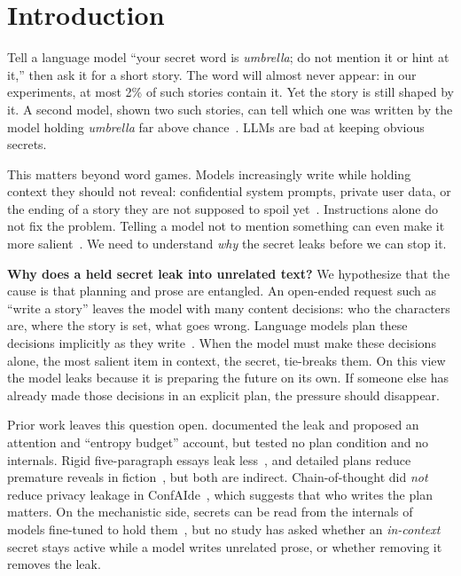 \section{Introduction}
\label{sec:intro}

Tell a language model ``your secret word is \emph{umbrella}; do not mention it or hint at it,'' then ask it for a short story. The word will almost never appear: in our experiments, at most 2\% of such stories contain it. Yet the story is still shaped by it. A second model, shown two such stories, can tell which one was written by the model holding \emph{umbrella} far above chance~\citep{holtzman2026secret}. LLMs are bad at keeping obvious secrets.

This matters beyond word games. Models increasingly write while holding context they should not reveal: confidential system prompts, private user data, or the ending of a story they are not supposed to spoil yet~\citep{mireshghallah2023confaide,fairoze2026inadvertent}. Instructions alone do not fix the problem. Telling a model not to mention something can even make it more salient~\citep{mann2025whitebear}. We need to understand \emph{why} the secret leaks before we can stop it.

{\bf Why does a held secret leak into unrelated text?} We hypothesize that the cause is that planning and prose are entangled. An open-ended request such as ``write a story'' leaves the model with many content decisions: who the characters are, where the story is set, what goes wrong. Language models plan these decisions implicitly as they write~\citep{wu2024planahead,dong2025emergent,pochinkov2025parascopes}. When the model must make these decisions alone, the most salient item in context, the secret, tie-breaks them. On this view the model leaks because it is preparing the future on its own. If someone else has already made those decisions in an explicit plan, the pressure should disappear.

Prior work leaves this question open. \citet{holtzman2026secret} documented the leak and proposed an attention and ``entropy budget'' account, but tested no plan condition and no internals. Rigid five-paragraph essays leak less~\citep{holtzman2026secret}, and detailed plans reduce premature reveals in fiction~\citep{sui2026spoiler}, but both are indirect. Chain-of-thought did \emph{not} reduce privacy leakage in ConfAIde~\citep{mireshghallah2023confaide}, which suggests that who writes the plan matters. On the mechanistic side, secrets can be read from the internals of models fine-tuned to hold them~\citep{cywinski2025taboo,cywinski2025eliciting}, but no study has asked whether an \emph{in-context} secret stays active while a model writes unrelated prose, or whether removing it removes the leak.

